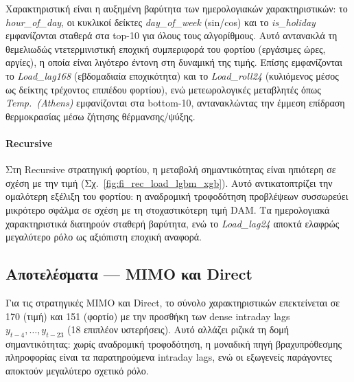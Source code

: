 Χαρακτηριστική είναι η αυξημένη βαρύτητα των ημερολογιακών χαρακτηριστικών: το
\textit{hour\_of\_day}, οι κυκλικοί δείκτες \textit{day\_of\_week} (sin/cos) και
το \textit{is\_holiday} εμφανίζονται σταθερά στα top-10 για όλους τους αλγορίθμους.
Αυτό αντανακλά τη θεμελιωδώς ντετερμινιστική εποχική συμπεριφορά του φορτίου
(εργάσιμες ώρες, αργίες), η οποία είναι λιγότερο έντονη στη δυναμική της τιμής.
Επίσης εμφανίζονται το \textit{Load\_lag168} (εβδομαδιαία εποχικότητα) και το
\textit{Load\_roll24} (κυλιόμενος μέσος ως δείκτης τρέχοντος επιπέδου φορτίου),
ενώ μετεωρολογικές μεταβλητές όπως \textit{Temp.~(Athens)} εμφανίζονται στα
bottom-10, αντανακλώντας την έμμεση επίδραση θερμοκρασίας μέσω ζήτησης
θέρμανσης/ψύξης.





\paragraph*{Recursive}

Στη Recursive στρατηγική φορτίου, η μεταβολή σημαντικότητας είναι ηπιότερη σε
σχέση με την τιμή
(Σχ.~\ref{fig:fi_rec_load_lgbm_xgb}).
Αυτό αντικατοπτρίζει την ομαλότερη εξέλιξη του φορτίου: η αναδρομική
τροφοδότηση προβλέψεων συσσωρεύει μικρότερο σφάλμα σε σχέση με τη
στοχαστικότερη τιμή DAM. Τα ημερολογιακά χαρακτηριστικά διατηρούν σταθερή
βαρύτητα, ενώ το \textit{Load\_lag24} αποκτά ελαφρώς μεγαλύτερο ρόλο ως
αξιόπιστη εποχική αναφορά.





\subsection{Αποτελέσματα --- MIMO και Direct}
\label{sec:fi_mimo_direct}

Για τις στρατηγικές MIMO και Direct, το σύνολο χαρακτηριστικών επεκτείνεται σε
170 (τιμή) και 151 (φορτίο) με την προσθήκη των dense intraday lags
$y_{t-4}, \ldots, y_{t-23}$ (18 επιπλέον υστερήσεις). Αυτό αλλάζει ριζικά τη
δομή σημαντικότητας: χωρίς αναδρομική τροφοδότηση, η μοναδική πηγή
βραχυπρόθεσμης πληροφορίας είναι τα παρατηρούμενα intraday lags, ενώ οι
εξωγενείς παράγοντες αποκτούν μεγαλύτερο σχετικό ρόλο.

